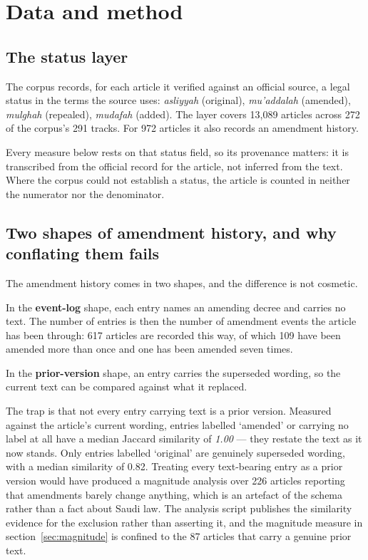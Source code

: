 \documentclass[11pt]{article}
\begin{document}
\section{Data and method}
\label{sec:method}

\subsection{The status layer}

The corpus records, for each article it verified against an official source, a
legal status in the terms the source uses: \emph{asliyyah} (original),
\emph{mu'addalah} (amended), \emph{mulghah} (repealed), \emph{mudafah}
(added). The layer covers 13,089 articles across 272 of the corpus's 291
tracks. For 972 articles it also records an amendment history.

Every measure below rests on that status field, so its provenance matters: it
is transcribed from the official record for the article, not inferred from the
text. Where the corpus could not establish a status, the article is counted in
neither the numerator nor the denominator.

\subsection{Two shapes of amendment history, and why conflating them fails}

The amendment history comes in two shapes, and the difference is not
cosmetic.

In the \textbf{event-log} shape, each entry names an amending decree and
carries no text. The number of entries is then the number of amendment events
the article has been through: 617 articles are recorded this way, of which 109
have been amended more than once and one has been amended seven times.

In the \textbf{prior-version} shape, an entry carries the superseded wording,
so the current text can be compared against what it replaced.

The trap is that not every entry carrying text is a prior version. Measured
against the article's current wording, entries labelled `amended' or carrying
no label at all have a median Jaccard similarity of \emph{1.00} --- they
restate the text as it now stands. Only entries labelled `original' are
genuinely superseded wording, with a median similarity of 0.82. Treating every
text-bearing entry as a prior version would have produced a magnitude analysis
over 226 articles reporting that amendments barely change anything, which is
an artefact of the schema rather than a fact about Saudi law. The analysis
script publishes the similarity evidence for the exclusion rather than
asserting it, and the magnitude measure in section~\ref{sec:magnitude} is
confined to the 87 articles that carry a genuine prior text.
\end{document}
